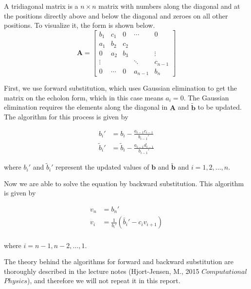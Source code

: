 \documentclass[%
oneside,                 %
final,                   %
10pt]{article}
\begin{document}
A tridiagonal matrix is a $n\times n$ matrix with numbers along the diagonal and at the positions directly above and below the diagonal and zeroes on all other positions. To visualize it, the form is shown below.
\begin{equation*}
\mathbf{A}=\begin{bmatrix}
b_1 & c_1 & 0 & \cdots & 0\\
a_1 & b_2 & c_2 & & \\
0 & a_2 & b_3 & & \vdots \\
\vdots & & & \ddots & c_{n-1}\\
0 & \cdots & 0 & a_{n-1} & b_n
\end{bmatrix}
\end{equation*}



First, we use forward substitution, which uses Gaussian elimination to get the matrix on the echolon form, which in this case means $a_i=0$. The Gaussian elimination requires the elements along the diagonal in $\mathbf{A}$ and $\mathbf{\tilde{b}}$ to be updated. The algorithm for this process is given by

\begin{equation*}
\begin{split}
b_i'&=b_i-\frac{a_{i-1}c_{i-1}}{b_{i-1}'}\\
\tilde{b}_i'&=\tilde{b}_i-\frac{a_{i-1}d_{i-1}}{b_{i-1}'}
\end{split}
\end{equation*}

where $b_i'$ and $\tilde{b}_i'$ represent the updated values of $\mathbf{b}$ and $\mathbf{\tilde{b}}$ and $i=1, 2, ..., n$.

Now we are able to solve the equation by backward substitution. This algorithm is given by

\begin{equation*}
\begin{split}
v_n&=b_n'\\
v_i&=\frac{1}{b_i'}(\tilde{b_i}'-c_iv_{i+1})\\
\end{split}
\end{equation*}

where $i=n-1, n-2, ..., 1$.

The theory behind the algorithms for forward and backward substitution are thoroughly described in the lecture notes (Hjort-Jensen, M., 2015 $Computational$ $Physics$), and therefore we will not repeat it in this report.
\end{document}

